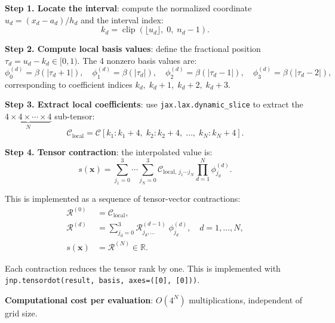 \documentclass[11pt,a4paper]{article}
\begin{document}
\textbf{Step 1. Locate the interval}: compute the normalized coordinate
$u_d = (x_d - a_d) / h_d$ and the interval index:
\begin{equation}\label{eq:interval}
  k_d = \operatorname{clip}\!\left(\lfloor u_d \rfloor,\; 0,\; n_d - 1\right).
\end{equation}

\textbf{Step 2. Compute local basis values}: define the fractional
position $\tau_d = u_d - k_d \in [0, 1)$. The 4 nonzero basis values are:
\begin{equation}\label{eq:local-basis}
  \phi^{(d)}_0 = \beta(|\tau_d + 1|), \quad
  \phi^{(d)}_1 = \beta(|\tau_d|), \quad
  \phi^{(d)}_2 = \beta(|\tau_d - 1|), \quad
  \phi^{(d)}_3 = \beta(|\tau_d - 2|),
\end{equation}
corresponding to coefficient indices $k_d, \; k_d+1, \; k_d+2, \; k_d+3$.

\textbf{Step 3. Extract local coefficients}: use
\texttt{jax.lax.dynamic\_slice} to extract the
$\underbrace{4 \times 4 \times \cdots \times 4}_{N}$ sub-tensor:
\begin{equation}\label{eq:local-coefs}
  \mathcal{C}_{\mathrm{local}}
  = \mathcal{C}[k_1 : k_1\!+\!4, \; k_2 : k_2\!+\!4, \; \ldots, \; k_N : k_N\!+\!4].
\end{equation}

\textbf{Step 4. Tensor contraction}: the interpolated value is:
\begin{equation}\label{eq:eval}
  s(\mathbf{x})
  = \sum_{j_1=0}^{3} \cdots \sum_{j_N=0}^{3}
    \mathcal{C}_{\mathrm{local},\, j_1 \cdots j_N}
    \prod_{d=1}^{N} \phi^{(d)}_{j_d}.
\end{equation}

This is implemented as a sequence of tensor-vector contractions:
\begin{align}
  \mathcal{R}^{(0)} &= \mathcal{C}_{\mathrm{local}}, \label{eq:contract-init} \\
  \mathcal{R}^{(d)} &= \sum_{j_d=0}^{3}
    \mathcal{R}^{(d-1)}_{j_d, \ldots} \; \phi^{(d)}_{j_d},
    \quad d = 1, \ldots, N, \label{eq:contract-step} \\
  s(\mathbf{x}) &= \mathcal{R}^{(N)} \in \mathbb{R}. \label{eq:contract-final}
\end{align}

Each contraction reduces the tensor rank by one. This is implemented with
\texttt{jnp.tensordot(result, basis, axes=([0], [0]))}.

\textbf{Computational cost per evaluation}: $O(4^N)$ multiplications,
independent of grid size.
\end{document}
